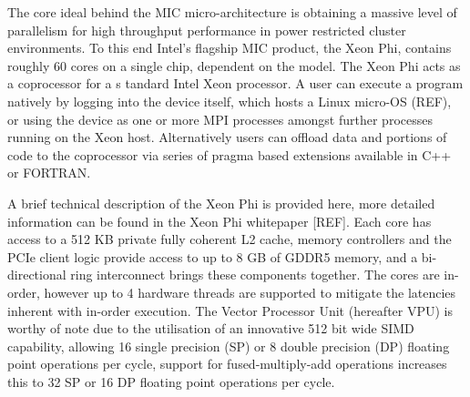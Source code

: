 \documentclass[runningheads,a4paper]{llncs}
\begin{document}
The core ideal behind the MIC micro-architecture is obtaining a massive level of parallelism for high throughput 
performance in power restricted cluster environments. To this end Intel's flagship MIC product, the Xeon Phi, 
contains roughly 60 cores on a single chip, dependent on the model. The Xeon Phi acts as a coprocessor for a s
tandard Intel Xeon processor. A user can execute a program natively by logging into the device itself, which hosts 
a Linux micro-OS (REF), or using the device as one or more MPI processes amongst further processes running on the 
Xeon host. Alternatively users can offload data and portions of code to the coprocessor via series of pragma 
based extensions available in C++ or FORTRAN.

A brief technical description of the Xeon Phi is provided here, more detailed information can be found in the 
Xeon Phi whitepaper [REF]. Each core has access to a 512 KB private fully coherent L2 cache, memory controllers 
and the PCIe client logic provide access to up to 8 GB of GDDR5 memory, and a bi-directional ring interconnect 
brings these components together. The cores are in-order, however up to 4 hardware threads are supported to mitigate 
the latencies inherent with in-order execution. The Vector Processor Unit (hereafter VPU) is worthy of note due to 
the utilisation of an innovative 512 bit wide SIMD capability, allowing 16 single precision (SP) or 8 double precision 
(DP) floating point operations per cycle, support for fused-multiply-add operations increases this to 32 SP or 16 DP 
floating point operations per cycle. 




\end{document}
